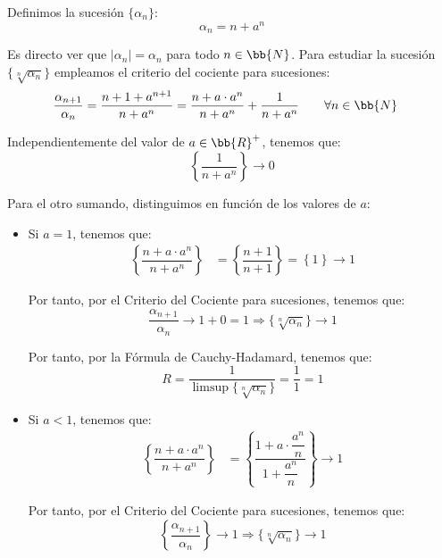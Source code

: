 \begin{ejercicio}
\begin{enumerate}
        Definimos la sucesión $\{\alpha_n\}$:
        \[
            \alpha_n = n+a^n
        \]

        Es directo ver que $|\alpha_n|=\alpha_n$ para todo $n\in \bb{N}$. Para estudiar la sucesión $\{\sqrt[n]{\alpha_n}\}$ empleamos el criterio del cociente para sucesiones:
        \begin{align*}
            \dfrac{\alpha_{n+1}}{\alpha_n} &= \dfrac{n+1+a^{n+1}}{n+a^n}
            = \dfrac{n+a\cdot a^{n}}{n+a^n}+\dfrac{1}{n+a^n}\qquad \forall n\in \bb{N}
        \end{align*}

        Independientemente del valor de $a\in \bb{R}^+$, tenemos que:
        \begin{equation*}
            \left\{\dfrac{1}{n+a^n}\right\}\to 0
        \end{equation*}

        Para el otro sumando, distinguimos en función de los valores de $a$:
        \begin{itemize}
            \item Si $a=1$, tenemos que:
            \begin{align*}
                \left\{\dfrac{n+a\cdot a^{n}}{n+a^n}\right\} &= \left\{\dfrac{n+1}{n+1}\right\} = \left\{1\right\}\to 1
            \end{align*}

            Por tanto, por el Criterio del Cociente para sucesiones, tenemos que:
            \begin{equation*}
                \dfrac{\alpha_{n+1}}{\alpha_n}\to 1+0 = 1
                \Longrightarrow
                \{\sqrt[n]{\alpha_n}\}\to 1
            \end{equation*}

            Por tanto, por la Fórmula de Cauchy-Hadamard, tenemos que:
            \begin{equation*}
                R = \dfrac{1}{\limsup\{\sqrt[n]{\alpha_n}\}} = \dfrac{1}{1} = 1
            \end{equation*}

            \item Si $a<1$, tenemos que:
            \begin{align*}
                \left\{\dfrac{n+a\cdot a^{n}}{n+a^n}\right\} &= \left\{\dfrac{1+a\cdot \dfrac{a^{n}}{n}}{1+\dfrac{a^n}{n}}\right\}\to 1
            \end{align*}

            Por tanto, por el Criterio del Cociente para sucesiones, tenemos que:
            \begin{equation*}
                \left\{\dfrac{\alpha_{n+1}}{\alpha_n}\right\}\to 1
                \Longrightarrow
                \{\sqrt[n]{\alpha_n}\}\to 1
            \end{equation*}


\end{itemize}
\end{enumerate}
\end{ejercicio}
